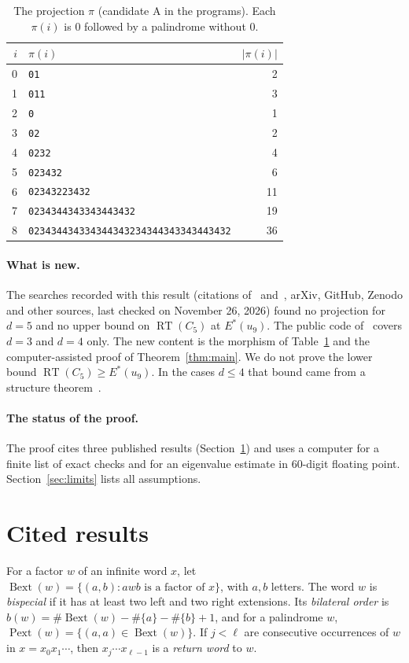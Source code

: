 \documentclass[11pt]{article}
\theoremstyle{remark}
\newcommand{\w}[1]{\textup{\texttt{#1}}}
\newcommand{\Bext}{\operatorname{Bext}}
\newcommand{\Pext}{\operatorname{Pext}}
\newcommand{\RT}{\operatorname{RT}}
\begin{document}
\begin{table}[ht]
\centering
\begin{tabular}{@{}rlr@{}}
\toprule
$i$ & $\pi(i)$ & $|\pi(i)|$\\
\midrule
0 & \w{01} & 2\\
1 & \w{011} & 3\\
2 & \w{0} & 1\\
3 & \w{02} & 2\\
4 & \w{0232} & 4\\
5 & \w{023432} & 6\\
6 & \w{02343223432} & 11\\
7 & \w{0234344343343443432} & 19\\
8 & \w{023434434334344343234344343343443432} & 36\\
\bottomrule
\end{tabular}
\caption{The projection $\pi$ (candidate A in the programs). Each $\pi(i)$ is $0$
followed by a palindrome without $0$.}
\label{tab:pi}
\end{table}

\paragraph{What is new.} The searches recorded with this result (citations of~\cite{dmp}
and~\cite{dp-limit}, arXiv, GitHub, Zenodo and other sources, last checked on
November 26, 2026) found no projection for $d=5$ and no upper bound on $\RT(C_5)$ at
$E^*(u_9)$. The public code of~\cite{dmp} covers $d=3$ and $d=4$ only. The new content is
the morphism of Table~\ref{tab:pi} and the computer-assisted proof of
Theorem~\ref{thm:main}. We do not prove the lower bound $\RT(C_5)\ge E^*(u_9)$. In the
cases $d\le4$ that bound came from a structure theorem~\cite{cmr,cmp,dmp}.

\paragraph{The status of the proof.} The proof cites three published results
(Section~\ref{sec:cited}) and uses a computer for a finite list of exact checks and for
an eigenvalue estimate in 60-digit floating point. Section~\ref{sec:limits} lists all
assumptions.

\section{Cited results}\label{sec:cited}

For a factor $w$ of an infinite word $x$, let $\Bext(w)=\{(a,b): awb \text{ is a factor
of } x\}$, with $a,b$ letters. The word $w$ is \emph{bispecial} if it has at least two
left and two right extensions. Its \emph{bilateral order} is
$b(w)=\#\Bext(w)-\#\{a\}-\#\{b\}+1$, and for a palindrome $w$,
$\Pext(w)=\{(a,a)\in\Bext(w)\}$. If $j<\ell$ are consecutive occurrences of $w$ in
$x=x_0x_1\cdots$, then $x_j\cdots x_{\ell-1}$ is a \emph{return word} to $w$.
\end{document}
